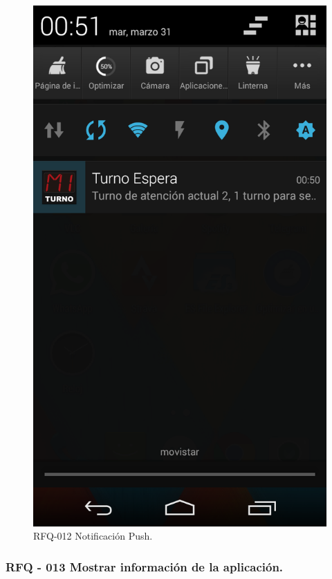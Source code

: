 \begin{figure}[H]
\centering
\includegraphics[scale=0.20]{images/capitulo6/rfq012.png}
\caption{RFQ-012 Notificación Push.}
\label{rfq012}
\end{figure}

\subsubsection{RFQ - 013 Mostrar información de la aplicación.}


